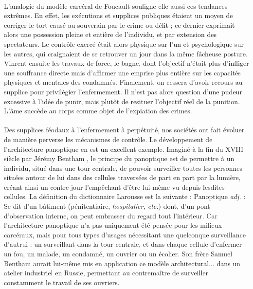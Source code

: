 \paragraph{} L'analogie du modèle carcéral de Foucault souligne elle aussi ces tendances extrêmes.
En effet, les exécutions et supplices publiques étaient un moyen de corriger le tort causé au souverain par le crime ou
délit ; ce dernier exprimait alors une possession pleine et entière de l'individu, et par extension des spectateurs. 
Le contrôle exercé était alors physique sur l'un et psychologique sur les autres, qui craignaient de se retrouver un jour
dans la même fâcheuse posture. Vinrent ensuite les travaux de force, le bagne, dont l'objectif n'était plus d'infliger
une souffrance directe mais d'affirmer une emprise plus entière sur les capacités physiques et mentales des condamnés.
Finalement, on cessera d'avoir recours au supplice pour privilégier l'enfermement. Il n'est pas alors question d'une
pudeur excessive à l'idée de punir, mais plutôt de resituer l'objectif réel de la punition.
\guillemotleft L'âme succède au corps comme objet de l'expiation des crimes.\guillemotright \cite{Foucault0}

\paragraph{} Des supplices féodaux à l'enfermement à perpétuité, nos sociétés ont fait évoluer de manière perverse les
mécanismes de contrôle. Le développement de l'architecture panoptique en est un excellent exemple. Imaginé à la fin du
XVIII siècle par Jérémy Bentham \cite{Panoptique1}, le principe du panoptique est de permettre à un individu,
situé dans une tour centrale, de pouvoir surveiller toutes les personnes situées autour de lui dans des cellules traversées
de part en part par la lumière, créant ainsi un contre-jour l'empêchant d'être lui-même vu depuis lesdites cellules.
La définition du dictionnaire Larousse est la suivante : \guillemotleft Panoptique \emph{adj.} : Se dit d'un bâtiment (pénitentiaire,
\emph{hospitalier, etc.}) dont, d'un pont d'observation interne, on peut embrasser du regard tout l'intérieur.\guillemotright
\cite{Panoptique0} Car l'architecture panoptique n'a pas uniquement été pensée pour les milieux carcéraux, mais pour tous
types d'usages nécessitant une quelconque surveillance d'autrui : \guillemotleft [...] un surveillant dans la
tour centrale, et dans chaque cellule d'enfermer un fou, un malade, un condamné, un ouvrier ou un écolier.\guillemotright
\cite{Panoptique2} Son frère Samuel Bentham aurait lui-même mis en application ce modèle architectural... dans un atelier
industriel en Russie, permettant au contremaître de surveiller constamment le travail de ses ouvriers.

